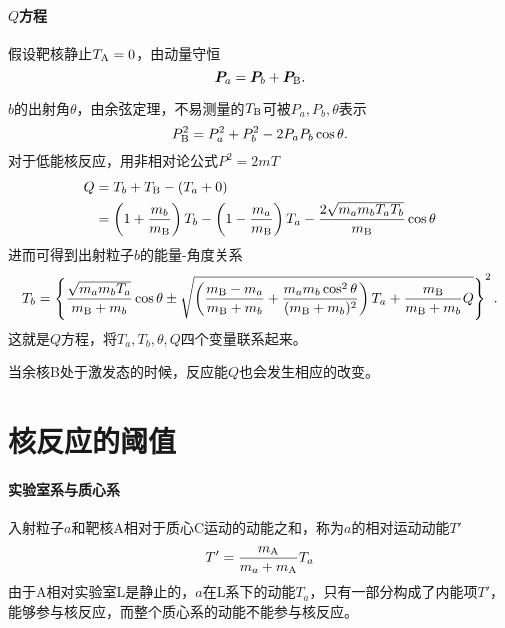 \paragraph{$Q$方程}假设靶核静止$T_{\mathrm{A}}=0$，由动量守恒
\[
	\bm P_a=\bm P_b+\bm P_{\mathrm{B}}.
\]
\begin{center}
\end{center}
$b$的出射角$\theta$，由余弦定理，不易测量的$T_{\mathrm{B}}$可被$P_a,P_b,\theta$表示
\[
	P_{\mathrm{B}}^2=P_a^2+P_b^2-2P_aP_b\cos\theta.
\]
对于低能核反应，用非相对论公式$P^2=2mT$
\begin{align}\notag
	Q&=T_b+T_{\mathrm{B}}-(T_a+0)\\
	&=\left(1+\frac{m_b}{m_{\mathrm{B}}}\right)T_b-\left(1-\frac{m_a}{m_{\mathrm{B}}}\right)T_a-\frac{2\sqrt{m_am_bT_aT_b}}{m_{\mathrm{B}}}\cos\theta
\end{align}
进而可得到出射粒子$b$的能量-角度关系
\begin{align}
	T_b=\left\{\frac{\sqrt{m_am_bT_a}}{m_{\mathrm{B}}+m_b}\cos\theta\pm\sqrt{\left(\frac{m_{\mathrm{B}}-m_a}{m_{\mathrm{B}}+m_b}+\frac{m_am_b\cos^2\theta}{(m_{\mathrm{B}}+m_b)^2}\right)T_a+\frac{m_{\mathrm{B}}}{m_{\mathrm{B}}+m_b}Q}\right\}^2.
\end{align}
这就是$Q$方程，将$T_a,T_b,\theta,Q$四个变量联系起来。

当余核B处于激发态的时候，反应能$Q$也会发生相应的改变。

\section{核反应的阈值}
\paragraph{实验室系与质心系}
入射粒子$a$和靶核A相对于质心C运动的动能之和，称为$a$的相对运动动能$T'$
\begin{align}
	T'=\frac{m_{\mathrm{A}}}{m_a+m_{\mathrm{A}}}T_a
\end{align}
由于A相对实验室L是静止的，$a$在L系下的动能$T_a$，只有一部分构成了内能项$T'$，能够参与核反应，而整个质心系的动能不能参与核反应。

